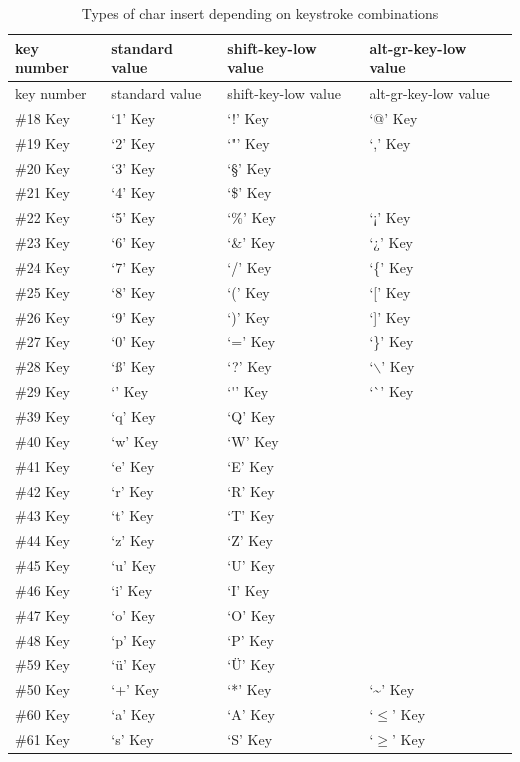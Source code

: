 \documentclass[output=paper]{LSP/langsci}
\begin{document}
\begin{longtable}{llll}%
\caption{Types of char insert depending on keystroke combinations}\label{couto:tab:6}\\
\lsptoprule
key number & standard value & shift-key-low value & alt-gr-key-low value \\
\midrule\endfirsthead
\midrule
key number & standard value & shift-key-low value & alt-gr-key-low value \\
\midrule
\endhead
\midrule\endfoot
\lspbottomrule\endlastfoot
\#18 Key & `1' Key & `!' Key & `@' Key \\
\#19 Key & `2' Key & `"' Key & `,' Key \\
\#20 Key & `3' Key & `§' Key & \\
\#21 Key & `4' Key & `\$' Key & \\
\#22 Key & `5' Key & `\%' Key & `¡' Key \\
\#23 Key & `6' Key & `\&' Key & `¿' Key \\
\#24 Key & `7' Key & `/' Key & `\{' Key \\
\#25 Key & `8' Key & `(' Key & `{[}' Key \\
\#26 Key & `9' Key & `)' Key & `{]}' Key \\
\#27 Key & `0' Key & `=' Key & `\}' Key \\
\#28 Key & `ß' Key & `?' Key & `$\backslash$' Key \\
\#29 Key & `' Key & `\'{ }' Key & `\`{ }' Key \\
\hline
\#39 Key & `q' Key & `Q' Key & \\
\#40 Key & `w' Key & `W' Key & \\
\#41 Key & `e' Key & `E' Key & \\
\#42 Key & `r' Key & `R' Key & \\
\#43 Key & `t' Key & `T' Key & \\
\#44 Key & `z' Key & `Z' Key & \\
\#45 Key & `u' Key & `U' Key & \\
\#46 Key & `i' Key & `I' Key & \\
\#47 Key & `o' Key & `O' Key & \\
\#48 Key & `p' Key & `P' Key & \\
\#59 Key & `ü' Key & `Ü' Key & \\
\#50 Key & `+' Key & `*' Key & `\~{ }' Key \\
\hline
\#60 Key & `a' Key & `A' Key & `$\leq$' Key\\
\#61 Key & `s' Key & `S' Key & `$\geq$' Key \\

\end{longtable}
\end{document}
